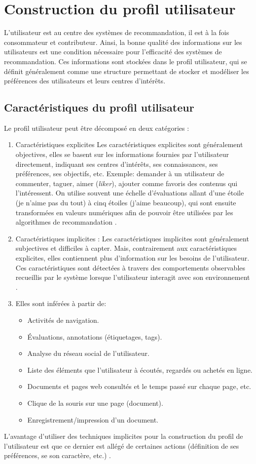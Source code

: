 \documentclass[a4paper,12pt,letterpaper,headsepline,singlespacing,headsepline, french]{report}
\begin{document}
\section{Construction du profil utilisateur}
L’utilisateur est au centre des systèmes de recommandation, il est à la fois consommateur et contributeur. Ainsi, la bonne qualité des informations sur les utilisateurs est une condition nécessaire pour l’efficacité des systèmes de recommandation. Ces informations sont stockées dans le profil utilisateur, qui se définit généralement comme une structure permettant de stocker et modéliser les préférences des utilisateurs et leurs centres d’intérêts\cite{ref20}.

\subsection {Caractéristiques du profil utilisateur }
Le profil utilisateur peut être décomposé en deux catégories \cite{ref21}:
\begin{enumerate}
	\item Caractéristiques explicites
	Les caractéristiques explicites sont généralement objectives, elles se basent sur les informations fournies par l’utilisateur directement, indiquant ses centres d’intérêts, ses connaissances, ses préférences, ses objectifs, etc. Exemple: demander à un utilisateur de commenter, taguer, aimer (\textit{liker}), ajouter comme favoris des contenus qui l’intéressent. 
	On utilise souvent une échelle d’évaluations allant d'une étoile (je n’aime pas du tout) à cinq étoiles (j’aime beaucoup), qui sont ensuite transformées en valeurs numériques afin de pouvoir être utilisées par les algorithmes de recommandation \cite{ref22}.
	\item 	Caractéristiques implicites :
	Les caractéristiques implicites sont généralement subjectives et difficiles à capter. Mais, contrairement aux caractéristiques explicites, elles contiennent plus d’information sur les besoins de l’utilisateur. Ces caractéristiques sont détectées à travers des comportements observables recueillis par le système lorsque l’utilisateur interagit avec son environnement \cite{ref23}.
	\item Elles sont inférées à partir de:
	\begin{itemize}
		\item Activités de navigation.
		\item Évaluations, annotations (étiquetages, tags).
		\item Analyse du réseau social de l’utilisateur.
		\item Liste des éléments que l’utilisateur à écoutés, regardés ou achetés en ligne.
		\item Documents et pages web consultés et le temps passé sur chaque page, etc.
		\item Clique de la souris sur une page (document).
		\item Enregistrement/impression d’un document.
		\end{itemize}
\end{enumerate}
L’avantage d’utiliser des techniques implicites pour la construction du profil de l’utilisateur est que ce dernier est allégé de certaines actions (définition de ses préférences, se son caractère, etc.) \cite{ref11}.
\end{document}
